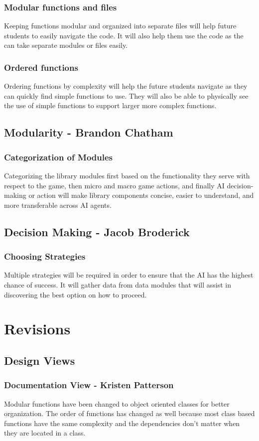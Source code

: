 \subsubsection{Modular functions and files}
	Keeping functions modular and organized into separate files will help future students to easily navigate the code. It will also help them use the code as the can take separate modules or files easily.

\subsubsection{Ordered functions}
	Ordering functions by complexity will help the future students navigate as they can quickly find simple functions to use. They will also be able to physically see the use of simple functions to support larger more complex functions.
\subsection{Modularity - Brandon Chatham}
\subsubsection{Categorization of Modules}
	Categorizing the library modules first based on the functionality they serve with respect to the game, then micro and macro game actions, and finally AI decision-making or action will make library components concise, easier to understand, and more transferable across AI agents.
\subsection{Decision Making - Jacob Broderick}
\subsubsection{Choosing Strategies}
	Multiple strategies will be required in order to ensure that the AI has the highest chance of success. It will gather data from data modules that will assist in discovering the best option on how to proceed. 

\section{Revisions}
\subsection{Design Views}
\subsubsection{Documentation View - Kristen Patterson}
Modular functions have been changed to object oriented classes for better organization. The order of functions has changed as well because most class based functions have the same complexity and the dependencies don't matter when they are located in a class.


